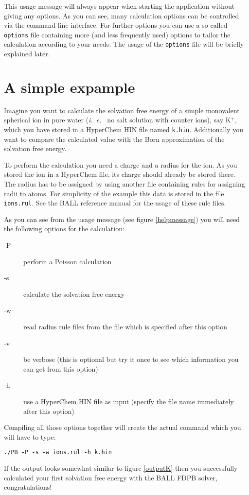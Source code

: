 \documentclass[12pt,twoside,a4paper]{article}
\begin{document}
This usage message will always appear when starting the application without
giving any options. As you can see, many calculation options can be
controlled via the command line interface. For further options you can use
a so-called {\tt options} file containing more (and less frequently used)
options to tailor the calculation according to your needs. The usage of the
{\tt options} file will be briefly explained later.


\section{A simple expample}

Imagine you want to calculate the solvation free energy of a simple
monovalent spherical ion in pure water (\textit{i.~e.~} no salt solution
with counter ions), say K$^+$, which you have stored in a HyperChem HIN
file named {\tt k.hin}. Additionally you want to compare the calculated
value with the Born approximation of the solvation free energy.

To perform the calculation you need a charge and a radius for the ion. As
you stored the ion in a HyperChem file, its charge should already be
stored there. The radius has to be assigned by using another file
containing rules for assigning radii to atoms. For simplicity of the
example this data is stored in the file {\tt ions.rul}. See the BALL
reference manual for the usage of these rule files.

As you can see from the usage message (see figure \ref{helpmessage}) you
will need the following options for the calculation:
\begin{description}
\item[-P] perform a Poisson calculation
\item[-s] calculate the solvation free energy
\item[-w] read radius rule files from the file which is specified after
this option
\item[-v] be verbose (this is optional but try it once to see which
information you can get from this option)
\item[-h] use a HyperChem HIN file as input (specify the file name
immediately after this option)
\end{description}

Compiling all those options together will create the actual command which
you will have to type:
\begin{verbatim}
./PB -P -s -w ions.rul -h k.hin
\end{verbatim}
If the output looks somewhat similar to figure \ref{outputK} then you
successfully calculated your first solvation free energy with the BALL FDPB
solver, congratulations!
\end{document}
